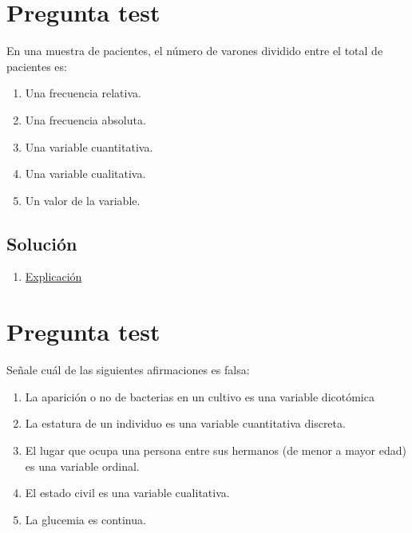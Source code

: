 \documentclass[
]{book}
\providecommand{\tightlist}{%
  \setlength{\itemsep}{0pt}\setlength{\parskip}{0pt}}
\begin{document}
\hypertarget{pregunta-test}{%
\section{Pregunta test}\label{pregunta-test}}

En una muestra de pacientes, el número de varones dividido entre el total de pacientes es:

\begin{enumerate}
\def\labelenumi{\alph{enumi})}
\tightlist
\item
  Una frecuencia relativa.
\item
  Una frecuencia absoluta.
\item
  Una variable cuantitativa.
\item
  Una variable cualitativa.
\item
  Un valor de la variable.
\end{enumerate}

\hypertarget{soluciuxf3n}{%
\subsection{Solución}\label{soluciuxf3n}}

\begin{enumerate}
\def\labelenumi{\alph{enumi})}
\tightlist
\item
  \href{https://1fjmanzano.github.io/bioestadistica/tablas-de-frecuencias.html}{Explicación}
\end{enumerate}

\hypertarget{pregunta-test-1}{%
\section{Pregunta test}\label{pregunta-test-1}}

Señale cuál de las siguientes afirmaciones es falsa:

\begin{enumerate}
\def\labelenumi{\alph{enumi})}
\tightlist
\item
  La aparición o no de bacterias en un cultivo es una variable dicotómica
\item
  La estatura de un individuo es una variable cuantitativa discreta.
\item
  El lugar que ocupa una persona entre sus hermanos (de menor a mayor edad) es una variable ordinal.
\item
  El estado civil es una variable cualitativa.
\item
  La glucemia es continua.
\end{enumerate}
\end{document}

